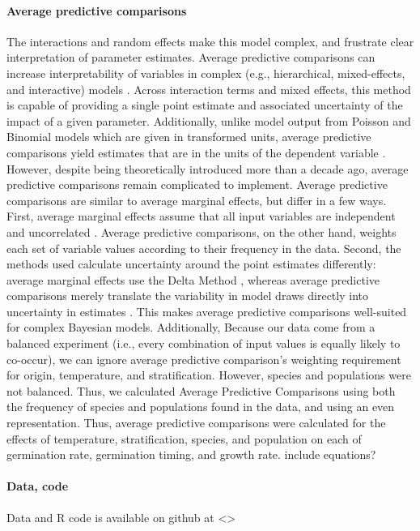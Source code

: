 \documentclass[12pt]{article}\usepackage[]{graphicx}\usepackage[]{color}
\begin{document}
	\paragraph{Average predictive comparisons} The interactions and random effects make this model complex, and frustrate clear interpretation of parameter estimates. Average predictive comparisons can increase interpretability of variables in complex (e.g., hierarchical, mixed-effects, and interactive) models \parencite{Gelman2007}. Across interaction terms and mixed effects, this method is capable of providing a single point estimate and associated uncertainty of the impact of a given parameter. Additionally, unlike model output from Poisson and Binomial models which are given in transformed units, average predictive comparisons yield estimates that are in the units of the dependent variable \parencite{Gelman2007}. However, despite being theoretically introduced more than a decade ago, average predictive comparisons remain complicated to implement. Average predictive comparisons are similar to average marginal effects, but differ in a few ways. First, average marginal effects assume that all input variables are independent and uncorrelated \parencite{Williams2012}. Average predictive comparisons, on the other hand, weights each set of variable values according to their frequency in the data. Second, the methods used calculate uncertainty around the point estimates differently: average marginal effects use the Delta Method \parencite{Williams2012}, whereas average predictive comparisons merely translate the variability in model draws directly into uncertainty in estimates \parencite{Gelman2007}. This makes average predictive comparisons well-suited for complex Bayesian models. Additionally, Because our data come from a balanced experiment  (i.e., every combination of input values is equally likely to co-occur), we can ignore average predictive comparison's weighting requirement for origin, temperature, and stratification. However, species and populations were not balanced. Thus, we calculated Average Predictive Comparisons using both the frequency of species and populations found in the data, and using an even representation. Thus,  average predictive comparisons were calculated for the effects of temperature, stratification, species, and population on each of germination rate, germination timing, and growth rate. \color{red} include equations? \color{black}

	\paragraph{Data, code} 
	Data and R code is available on github at <> 
\end{document}
